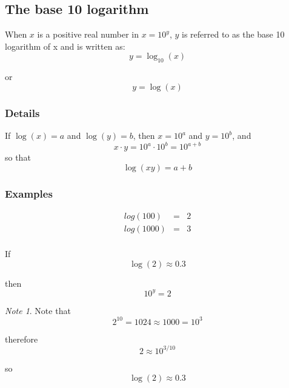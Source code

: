 \documentclass[12pt,a4paper]{article}
\theoremstyle{regla}
\theoremstyle{remark}
\newtheorem{notes}{Note}[section]
\theoremstyle{definition}
\theoremstyle{nonumberbreak}
\begin{document}
\subsection{The base 10 logarithm}
\begin{fbox}
\begin{minipage}{0.97\textwidth}
When $x$ is a positive real number in $x=10^y$, $y$ is referred to as the base 10 logarithm of x and is written as: 
$$ y=\log_{10}(x) $$

or 
$$ y=\log(x) $$



\end{minipage}
\end{fbox}
\subsubsection{Details}
If $\log (x) = a$ and $\log (y)=b$, then $x = 10^a$ and $y = 10^b$, and
$$ x \cdot y = 10^a \cdot 10^b = 10^{a+b}$$
so that $$ \log(xy) = a+b $$
\subsubsection{Examples}
\begin{xmpl}

\begin{eqnarray*}
log(100)&=& 2 \\
log(1000)&=& 3 \\
\end{eqnarray*}
\end{xmpl}
\begin{xmpl}
If $$\log(2) \approx 0.3$$

 
then $$10^y=2$$

 
\begin {notes}
Note that 
$$2^{10}=1024 \approx 1000 = 10^3$$

therefore
$$2 \approx 10^{3/10}$$

so
$$\log (2) \approx 0.3$$
\end{notes}
\end{xmpl}



\end{document}
